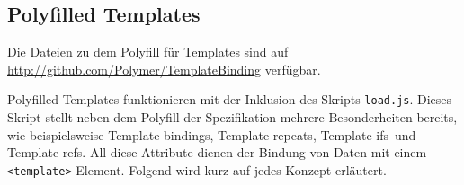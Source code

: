 \subsection{Polyfilled Templates}
\label{sec:4_Polymer_PTemplates}

Die Dateien zu dem Polyfill für Templates sind auf \url{http://github.com/Polymer/TemplateBinding} verfügbar.

Polyfilled Templates funktionieren mit der Inklusion des Skripts \lstinline|load.js|. Dieses Skript stellt neben dem Polyfill der Spezifikation mehrere Besonderheiten bereits, wie beispielsweise \glqq Template bindings\grqq , \glqq Template repeats\grqq , \glqq Template ifs\grqq\ und \glqq Template refs\grqq . All diese Attribute dienen der Bindung von Daten mit einem \lstinline|<template>|-Element. Folgend wird kurz auf jedes Konzept erläutert.

